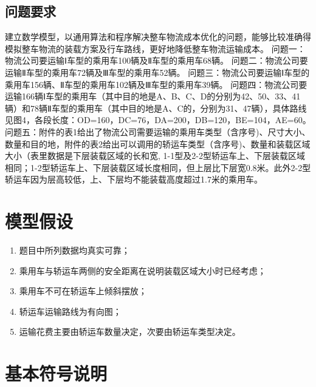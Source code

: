 \documentclass[UTF8]{ctexart}
\begin{document}


\subsection{问题要求}
建立数学模型，以通用算法和程序解决整车物流成本优化的问题，能够比较准确得模拟整车物流的装载方案及行车路线，更好地降低整车物流运输成本。
问题一：物流公司要运输Ⅰ车型的乘用车100辆及Ⅱ车型的乘用车68辆。
问题二：物流公司要运输Ⅱ车型的乘用车72辆及Ⅲ车型的乘用车52辆。
问题三：物流公司要运输Ⅰ车型的乘用车156辆、Ⅱ车型的乘用车102辆及Ⅲ车型的乘用车39辆。
问题四：物流公司要运输166辆Ⅰ车型的乘用车（其中目的地是A、B、C、D的分别为42、50、33、41辆）和78辆Ⅱ车型的乘用车（其中目的地是A、C的，分别为31、47辆），具体路线见图4，各段长度：OD=160，DC=76，DA=200，DB=120，BE=104，AE=60。
问题五：附件的表1给出了物流公司需要运输的乘用车类型（含序号)、尺寸大小、数量和目的地，附件的表2给出可以调用的轿运车类型（含序号)、数量和装载区域大小（表里数据是下层装载区域的长和宽, 1-1型及2-2型轿运车上、下层装载区域相同；1-2型轿运车上、下层装载区域长度相同，但上层比下层宽0.8米。此外2-2型轿运车因为层高较低，上、下层均不能装载高度超过1.7米的乘用车。

\section{模型假设}
\begin{enumerate}
	\item 	题目中所列数据均真实可靠；
	\item	乘用车与轿运车两侧的安全距离在说明装载区域大小时已经考虑；
	\item	乘用车不可在轿运车上倾斜摆放；
	\item	轿运车运输路线为有向图；
	\item	运输花费主要由轿运车数量决定，次要由轿运车类型决定。

\end{enumerate}

\section{基本符号说明}
\label{sec:symbols}
\end{document}
